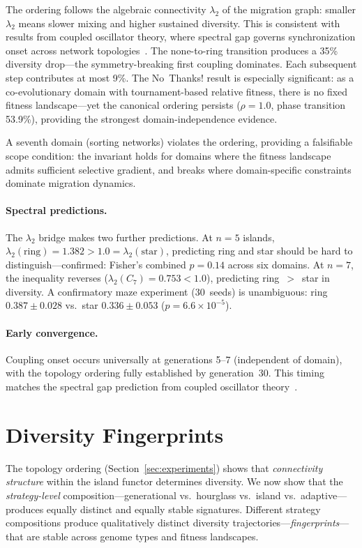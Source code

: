 \documentclass[dvipsnames,format=sigconf,anonymous=true,review=true]{acmart}
\begin{document}
The ordering follows the algebraic connectivity $\lambda_2$ of the migration graph: smaller $\lambda_2$ means slower mixing and higher sustained diversity. This is consistent with results from coupled oscillator theory, where spectral gap governs synchronization onset across network topologies~\cite{sanz2026algebraic}. The none-to-ring transition produces a 35\% diversity drop---the symmetry-breaking first coupling dominates. Each subsequent step contributes at most 9\%. The No~Thanks! result is especially significant: as a co-evolutionary domain with tournament-based relative fitness, there is no fixed fitness landscape---yet the canonical ordering persists ($\rho = 1.0$, phase transition 53.9\%), providing the strongest domain-independence evidence.

A seventh domain (sorting networks) violates the ordering, providing a falsifiable scope condition: the invariant holds for domains where the fitness landscape admits sufficient selective gradient, and breaks where domain-specific constraints dominate migration dynamics.

\paragraph{Spectral predictions.}
The $\lambda_2$ bridge makes two further predictions. At $n{=}5$ islands, $\lambda_2(\text{ring}) = 1.382 > 1.0 = \lambda_2(\text{star})$, predicting ring and star should be hard to distinguish---confirmed: Fisher's combined $p = 0.14$ across six domains. At $n{=}7$, the inequality reverses ($\lambda_2(C_7) = 0.753 < 1.0$), predicting ring~$>$~star in diversity. A confirmatory maze experiment (30~seeds) is unambiguous: ring $0.387 \pm 0.028$ vs.\ star $0.336 \pm 0.053$ ($p = 6.6 \times 10^{-5}$).

\paragraph{Early convergence.}
Coupling onset occurs universally at generations 5--7 (independent of domain), with the topology ordering fully established by generation~30. This timing matches the spectral gap prediction from coupled oscillator theory~\cite{sanz2026algebraic}.

\section{Diversity Fingerprints}
\label{sec:fingerprints}

The topology ordering (Section~\ref{sec:experiments}) shows that \emph{connectivity structure} within the island functor determines diversity. We now show that the \emph{strategy-level} composition---generational vs.\ hourglass vs.\ island vs.\ adaptive---produces equally distinct and equally stable signatures. Different strategy compositions produce qualitatively distinct diversity trajectories---\emph{fingerprints}---that are stable across genome types and fitness landscapes.
\end{document}
